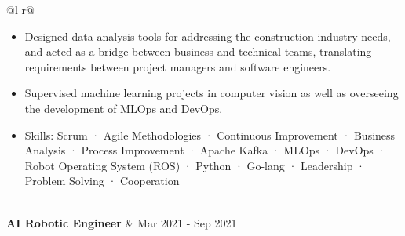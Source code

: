 \documentclass[a4paper,12pt]{article}
\begin{document}
\begin{tabularx}{\linewidth}{ @{}l r@{} }
{\begin{minipage}[t]{\linewidth}
\begin{itemize}[nosep,after=\strut, leftmargin=1em, itemsep=3pt]
        \item[--] Designed data analysis tools for addressing the construction industry needs, and acted as a bridge between business and technical teams, translating requirements between project managers and software engineers.
        \item[--] Supervised machine learning projects in computer vision as well as overseeing the development of MLOps and DevOps.
        \item[--] Skills: Scrum · Agile Methodologies · Continuous Improvement · Business Analysis · Process Improvement · Apache Kafka · MLOps · DevOps · Robot Operating System (ROS) · Python · Go-lang · Leadership · Problem Solving · Cooperation
    \end{itemize}
\end{minipage}
}  \\
\textbf{AI Robotic Engineer} & \hfill Mar 2021 - Sep 2021 \\[3.75pt]
  \\
\end{tabularx}
\end{document}
